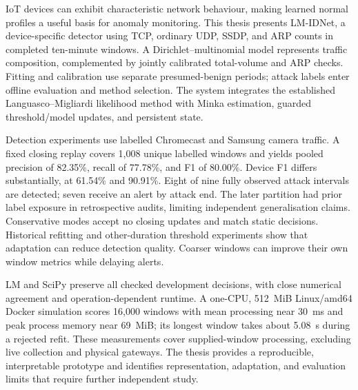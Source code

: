IoT devices can exhibit characteristic network behaviour, making learned
normal profiles a useful basis for anomaly monitoring. This thesis presents
LM-IDNet, a device-specific detector using TCP, ordinary UDP, SSDP, and ARP
counts in completed ten-minute windows. A Dirichlet--multinomial model
represents traffic composition, complemented by jointly calibrated total-volume
and ARP checks. Fitting and calibration use separate presumed-benign periods;
attack labels enter offline evaluation and method selection. The system
integrates the established Languasco--Migliardi likelihood method with
Minka estimation, guarded threshold/model updates, and persistent state.

Detection experiments use labelled Chromecast and Samsung camera traffic.
A fixed closing replay covers 1,008 unique labelled windows and yields pooled
precision of 82.35\%, recall
of 77.78\%, and F1 of 80.00\%. Device F1 differs substantially, at 61.54\%
and 90.91\%. Eight of nine fully observed attack intervals are detected;
seven receive an alert by attack end. The later partition had prior label
exposure in retrospective audits, limiting independent generalisation claims.
Conservative modes accept no closing updates and match static decisions.
Historical refitting and other-duration threshold experiments show that
adaptation can reduce detection quality. Coarser windows can improve their
own window metrics while delaying alerts.

LM and SciPy preserve all checked development decisions, with close numerical
agreement and operation-dependent runtime. A one-CPU, 512~MiB Linux/amd64
Docker simulation scores 16,000 windows with mean processing near 30~ms
and peak process memory near 69~MiB; its longest window takes about
5.08~s during a rejected refit. These measurements cover supplied-window
processing, excluding live collection and physical gateways. The thesis
provides a reproducible, interpretable prototype and identifies representation,
adaptation, and evaluation limits that require further independent study.
